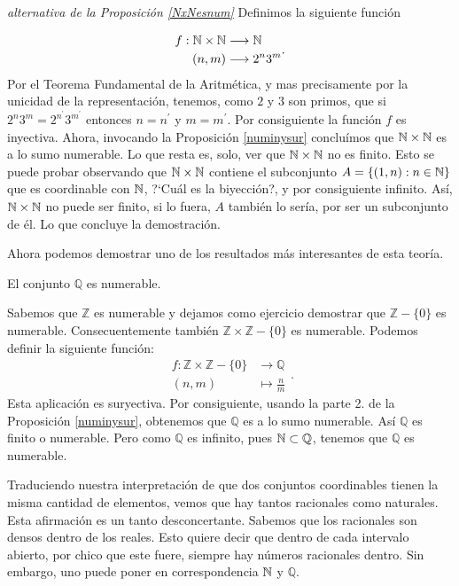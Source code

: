 \begin{demo} \emph{alternativa de la Proposición \ref{NxNesnum}}
Definimos la siguiente función

\[\begin{split}
f:\mathbb{N}\times\mathbb{N}&\longrightarrow\mathbb{N}\\
 (n,m)&\longrightarrow 2^n3^m\\
 \end{split}.
 \]
Por el Teorema Fundamental de la Aritmética, y mas precisamente
por la unicidad de la representación, tenemos, como $2$ y $3$
son primos, que si $2^n3^m=2^{n^{\prime}}3^{m^{\prime}}$ entonces
$n=n^{\prime}$ y $m=m^{\prime}$. Por consiguiente la función $f$
es inyectiva. Ahora, invocando la Proposición \vref{numinysur}
concluímos que $\mathbb{N}\times\mathbb{N}$ es a lo sumo numerable. Lo que
resta es, solo, ver que $\mathbb{N}\times\mathbb{N}$ no es finito. Esto se puede
probar observando que $\mathbb{N}\times\mathbb{N}$ contiene el subconjunto
$A=\{(1,n):n\in\mathbb{N}\}$ que es coordinable con $\mathbb{N}$, ?`Cuál es la
biyección?, y por consiguiente infinito. Así,
$\mathbb{N}\times\mathbb{N}$ no puede ser finito, si lo fuera, $A$ también lo
sería, por ser un subconjunto de él. Lo que concluye la
demostración.
\end{demo}

Ahora podemos demostrar  uno de los resultados más interesantes
de esta teoría.

\begin{teorema} El conjunto $\mathbb{Q}$ es numerable.
\end{teorema}
\begin{demo} Sabemos que $\mathbb{Z}$ es numerable y dejamos como ejercicio demostrar que $\mathbb{Z}-\{0\}$ es numerable. Consecuentemente también  $\mathbb{Z}\times\mathbb{Z}-\{0\}$ es numerable. Podemos
definir la siguiente función:
\[
\begin{split}
f:\mathbb{Z}\times\mathbb{Z}-\{0\}&\longrightarrow\mathbb{Q}\\
(n,m)&\longmapsto \frac{n}{m}
\end{split}
.\] Esta aplicación es suryectiva. Por consiguiente, usando la
parte 2. de la Proposición \vref{numinysur}, obtenemos que
$\mathbb{Q}$ es a lo sumo numerable. Así $\mathbb{Q}$ es
finito o numerable. Pero como $\mathbb{Q}$ es infinito, pues
$\mathbb{N}\subset\mathbb{Q}$, tenemos que $\mathbb{Q}$ es numerable. \end{demo}


Traduciendo nuestra interpretación de que dos conjuntos
coordinables tienen la misma cantidad de elementos, vemos que hay
tantos racionales como naturales. Esta afirmación es un tanto
desconcertante. Sabemos que los racionales son
densos dentro de los reales. Esto quiere decir que dentro de cada
intervalo abierto, por chico que este fuere, siempre hay números
racionales dentro. Sin embargo, uno puede poner en correspondencia
$\mathbb{N}$ y $\mathbb{Q}$.  

